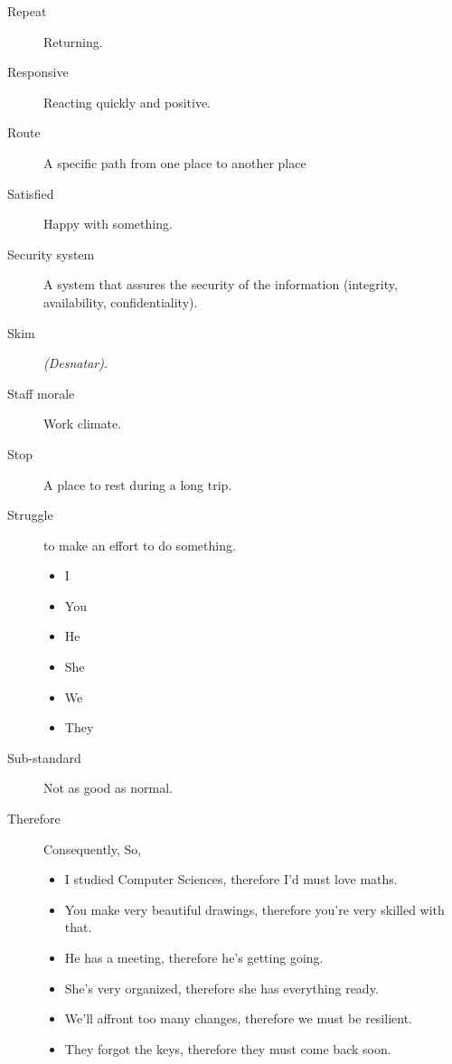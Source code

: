 \begin{multicols}{2}
\begin{description}
\item[Repeat] Returning.

\item[Responsive] Reacting quickly and positive.

\item[Route] A specific path from one place to another place

\item[Satisfied] Happy with something.

\item[Security system] A system that assures the security of the information (integrity, availability, confidentiality).

\item[Skim] \emph{(Desnatar)}.

\item[Staff morale] Work climate.

\item[Stop] A place to rest during a long trip.

\item[Struggle] to make an effort to do something.
\begin{itemize}
\item I
\item You
\item He
\item She
\item We
\item They
\end{itemize}

\item[Sub-standard] Not as good as normal.

\item[Therefore] Consequently, So, 
\begin{itemize}
\item I studied Computer Sciences, therefore I'd must love maths.
\item You make very beautiful drawings, therefore you're very skilled with that.
\item He has a meeting, therefore he's getting going.
\item She's very organized, therefore she has everything ready.
\item We'll affront too many changes, therefore we must be resilient.
\item They forgot the keys, therefore they must come back soon.
\end{itemize}


\end{description}
\end{multicols}
